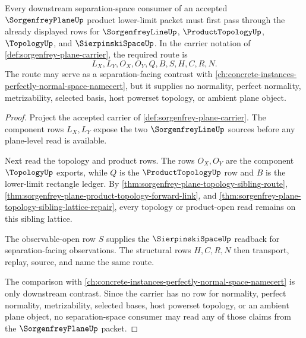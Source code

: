 \begin{theorem}
\label{thm:sorgenfrey-plane-downstream-link}
Every downstream separation-space consumer of an accepted $\SorgenfreyPlaneUp$ product lower-limit packet must first pass through the already displayed rows for $\SorgenfreyLineUp$, $\ProductTopologyUp$, $\TopologyUp$, and $\SierpinskiSpaceUp$. In the carrier notation of \autoref{def:sorgenfrey-plane-carrier}, the required route is
$$
L_X,L_Y,O_X,O_Y,Q,B,S,H,C,R,N .
$$
The route may serve as a separation-facing contrast with \autoref{ch:concrete-instances-perfectly-normal-space-namecert}, but it supplies no normality, perfect normality, metrizability, selected basis, host powerset topology, or ambient plane object.
\end{theorem}
\begin{proof}
Project the accepted carrier of \autoref{def:sorgenfrey-plane-carrier}. The component rows $L_X,L_Y$ expose the two $\SorgenfreyLineUp$ sources before any plane-level read is available.

Next read the topology and product rows. The rows $O_X,O_Y$ are the component $\TopologyUp$ exports, while $Q$ is the $\ProductTopologyUp$ row and $B$ is the lower-limit rectangle ledger. By \autoref{thm:sorgenfrey-plane-topology-sibling-route}, \autoref{thm:sorgenfrey-plane-product-topology-forward-link}, and \autoref{thm:sorgenfrey-plane-topology-sibling-lattice-repair}, every topology or product-open read remains on this sibling lattice.

The observable-open row $S$ supplies the $\SierpinskiSpaceUp$ readback for separation-facing observations. The structural rows $H,C,R,N$ then transport, replay, source, and name the same route.

The comparison with \autoref{ch:concrete-instances-perfectly-normal-space-namecert} is only downstream contrast. Since the carrier has no row for normality, perfect normality, metrizability, selected bases, host powerset topology, or an ambient plane object, no separation-space consumer may read any of those claims from the $\SorgenfreyPlaneUp$ packet.
\end{proof}
